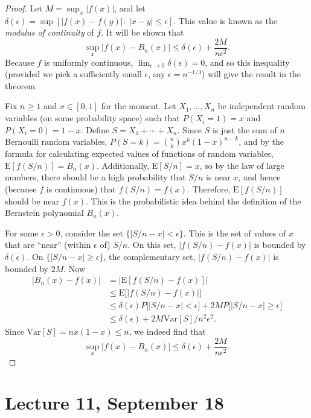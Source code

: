 \documentclass[11pt,fleqn]{book} %
\begin{document}
\begin{proof}
	Let $M = \sup_x |f(x)|$, and let $\delta(\epsilon) = \sup[|f(x)-f(y)|:\;|x-y| \leq \epsilon]$. This value is known as the \emph{modulus of continuity} of $f$. It will be shown that
	\[
		\sup_x |f(x) - B_n(x)| \leq \delta(\epsilon) + \frac{2M}{n\epsilon^2}.
	\]
	Because $f$ is uniformly continuous, $\lim_{\epsilon \to 0} \delta(\epsilon) = 0$, and so this inequality (provided we pick a sufficiently small $\epsilon$, say $\epsilon = n^{-1/3}$) will give the result in the theorem.

	Fix $n \geq 1$ and $x \in [0,1]$ for the moment. Let $X_1,\dots,X_n$ be independent random variables (on some probability space) such that $P(X_i=1) = x$ and $P(X_i=0) = 1-x$. Define $S = X_1 + \cdots + X_n$. Since $S$ is just the sum of $n$ Bernoulli random variables, $P(S=k) = \binom{n}{k} x^k(1-x)^{n-k}$, and by the formula for calculating expected values of functions of random variables, $\textrm{E}[f(S/n)] = B_n(x)$. Additionally, $\textrm{E}[S/n] = x$, so by the law of large numbers, there should be a high probability that $S/n$ is near $x$, and hence (because $f$ is continuous) that $f(S/n) = f(x)$. Therefore, $\textrm{E}[f(S/n)]$ should be near $f(x)$. This is the probabilistic idea behind the definition of the Bernstein polynomial $B_n(x)$.

	For some $\epsilon > 0$, consider the set $\{|S/n-x| < \epsilon\}$. This is the set of values of $x$ that are ``near'' (within $\epsilon$ of) $S/n$. On this set, $|f(S/n) - f(x)|$ is bounded by $\delta(\epsilon)$. On $\{|S/n-x| \geq \epsilon\}$, the complementary set, $|f(S/n) - f(x)|$ is bounded by $2M$. Now
	\begin{align*}
		|B_n(x) - f(x)| &= \big|\textrm{E}[f(S/n) - f(x)]\big| \\
		&\leq \textrm{E}\big[|f(S/n) - f(x)|\big] \\
		&\leq \delta(\epsilon) P \big[|S/n-x| < \epsilon\big] + 2MP \big[|S/n-x| \geq \epsilon\big] \\
		&\leq \delta(\epsilon) + 2M \textrm{Var}[S]/n^2\epsilon^2. \tag{Chebyshev's Inequality}
	\end{align*}
	Since $\textrm{Var}[S] = nx(1-x) \leq n$, we indeed find that
	\[
		\sup_x |f(x) - B_n(x)| \leq \delta(\epsilon) + \frac{2M}{n\epsilon^2}.
	\]
\end{proof}

\section{Lecture 11, September 18}
\end{document}
